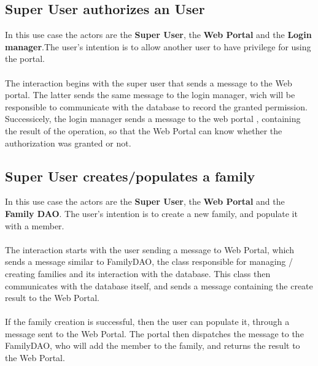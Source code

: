\subsection{Super User authorizes an User}
In this use case the actors are the \textbf{Super User}, the \textbf{Web Portal} and the \textbf{Login manager}.The user's intention is to allow another user to have privilege for using the portal.\\
\\The interaction begins with the super user that sends a message to the Web portal. The latter sends the same message to the login manager, wich will be responsible to communicate with the database to record the granted permission. Successicely, the login manager sends a message to the web portal , containing the result of the operation, so that the Web Portal can know whether the authorization was granted or not.

\subsection{Super User creates/populates a family}
In this use case the actors are the \textbf{Super User}, the \textbf{Web Portal} and the \textbf{Family DAO}. The user's intention is to create a new family, and populate it with a member. \\
\\The interaction starts with the user sending a message  to Web Portal, which sends a message similar to FamilyDAO, the class responsible for managing / creating families and its interaction with the database. This class then communicates with the database itself, and sends a message containing the create result to the Web Portal. \\
\\If the family creation is successful, then the user can populate it, through a message   sent to the Web Portal. The portal then dispatches the message to the FamilyDAO, who will add the member to the family, and returns the result to the Web Portal.

